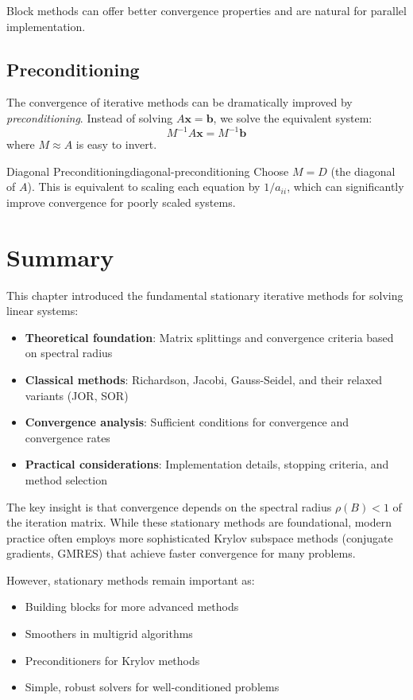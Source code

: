 Block methods can offer better convergence properties and are natural for parallel implementation.

\subsection{Preconditioning}

The convergence of iterative methods can be dramatically improved by \emph{preconditioning}. Instead of solving $A\mathbf{x} = \mathbf{b}$, we solve the equivalent system:
\begin{equation}
    M^{-1}A\mathbf{x} = M^{-1}\mathbf{b}
\end{equation}
where $M \approx A$ is easy to invert.

\begin{example}{Diagonal Preconditioning}{diagonal-preconditioning}
    Choose $M = D$ (the diagonal of $A$). This is equivalent to scaling each equation by $1/a_{ii}$, which can significantly improve convergence for poorly scaled systems.
\end{example}

\section{Summary}

This chapter introduced the fundamental stationary iterative methods for solving linear systems:

\begin{itemize}
    \item \textbf{Theoretical foundation}: Matrix splittings and convergence criteria based on spectral radius
    \item \textbf{Classical methods}: Richardson, Jacobi, Gauss-Seidel, and their relaxed variants (JOR, SOR)
    \item \textbf{Convergence analysis}: Sufficient conditions for convergence and convergence rates
    \item \textbf{Practical considerations}: Implementation details, stopping criteria, and method selection
\end{itemize}

The key insight is that convergence depends on the spectral radius $\rho(B) < 1$ of the iteration matrix. While these stationary methods are foundational, modern practice often employs more sophisticated Krylov subspace methods (conjugate gradients, GMRES) that achieve faster convergence for many problems.

However, stationary methods remain important as:
\begin{itemize}
    \item Building blocks for more advanced methods
    \item Smoothers in multigrid algorithms
    \item Preconditioners for Krylov methods
    \item Simple, robust solvers for well-conditioned problems
\end{itemize}
